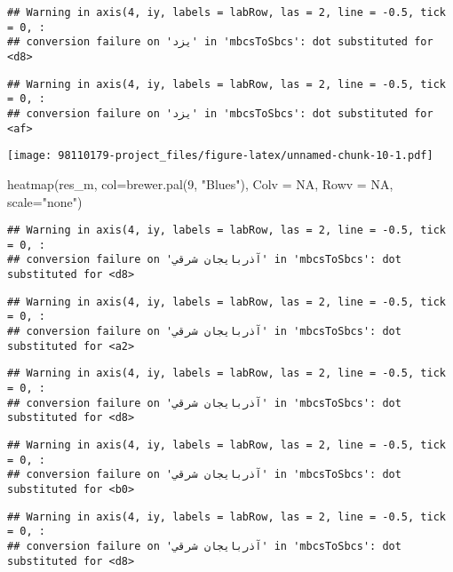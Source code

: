 \documentclass[
]{article}
\newenvironment{Shaded}{\begin{snugshade}}{\end{snugshade}}
\newcommand{\AttributeTok}[1]{\textcolor[rgb]{0.77,0.63,0.00}{#1}}
\newcommand{\ConstantTok}[1]{\textcolor[rgb]{0.00,0.00,0.00}{#1}}
\newcommand{\DecValTok}[1]{\textcolor[rgb]{0.00,0.00,0.81}{#1}}
\newcommand{\FunctionTok}[1]{\textcolor[rgb]{0.00,0.00,0.00}{#1}}
\newcommand{\NormalTok}[1]{#1}
\newcommand{\StringTok}[1]{\textcolor[rgb]{0.31,0.60,0.02}{#1}}
\begin{document}
\begin{verbatim}
## Warning in axis(4, iy, labels = labRow, las = 2, line = -0.5, tick = 0, :
## conversion failure on 'یزد' in 'mbcsToSbcs': dot substituted for <d8>
\end{verbatim}

\begin{verbatim}
## Warning in axis(4, iy, labels = labRow, las = 2, line = -0.5, tick = 0, :
## conversion failure on 'یزد' in 'mbcsToSbcs': dot substituted for <af>
\end{verbatim}

\texttt{[image: 98110179-project\_files/figure-latex/unnamed-chunk-10-1.pdf]}

\begin{Shaded}
\begin{Highlighting}[]
\FunctionTok{heatmap}\NormalTok{(res\_m, }\AttributeTok{col=}\FunctionTok{brewer.pal}\NormalTok{(}\DecValTok{9}\NormalTok{, }\StringTok{"Blues"}\NormalTok{), }\AttributeTok{Colv =} \ConstantTok{NA}\NormalTok{, }\AttributeTok{Rowv =} \ConstantTok{NA}\NormalTok{, }\AttributeTok{scale=}\StringTok{"none"}\NormalTok{)}
\end{Highlighting}
\end{Shaded}

\begin{verbatim}
## Warning in axis(4, iy, labels = labRow, las = 2, line = -0.5, tick = 0, :
## conversion failure on 'آذربايجان شرقي' in 'mbcsToSbcs': dot substituted for <d8>
\end{verbatim}

\begin{verbatim}
## Warning in axis(4, iy, labels = labRow, las = 2, line = -0.5, tick = 0, :
## conversion failure on 'آذربايجان شرقي' in 'mbcsToSbcs': dot substituted for <a2>
\end{verbatim}

\begin{verbatim}
## Warning in axis(4, iy, labels = labRow, las = 2, line = -0.5, tick = 0, :
## conversion failure on 'آذربايجان شرقي' in 'mbcsToSbcs': dot substituted for <d8>
\end{verbatim}

\begin{verbatim}
## Warning in axis(4, iy, labels = labRow, las = 2, line = -0.5, tick = 0, :
## conversion failure on 'آذربايجان شرقي' in 'mbcsToSbcs': dot substituted for <b0>
\end{verbatim}

\begin{verbatim}
## Warning in axis(4, iy, labels = labRow, las = 2, line = -0.5, tick = 0, :
## conversion failure on 'آذربايجان شرقي' in 'mbcsToSbcs': dot substituted for <d8>
\end{verbatim}
\end{document}
